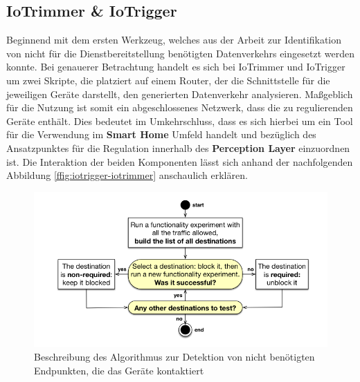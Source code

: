 \subsection{IoTrimmer \& IoTrigger}
\label{sec:Regulationsmöglichkeiten:ssec:IoTrimmer und IoTrigger}

Beginnend mit dem ersten Werkzeug, welches aus der Arbeit \cite{Mandalari2021} zur Identifikation von nicht für die Dienstbereitstellung benötigten Datenverkehrs eingesetzt werden konnte. Bei genauerer Betrachtung handelt es sich bei IoTrimmer und IoTrigger \cite{IoTrim2021} um zwei Skripte, die platziert auf einem Router, der die Schnittstelle für die jeweiligen Geräte darstellt, den generierten Datenverkehr analysieren. 
Maßgeblich für die Nutzung ist somit ein abgeschlossenes Netzwerk, dass die zu regulierenden Geräte enthält. Dies bedeutet im Umkehrschluss, dass es sich hierbei um ein Tool für die Verwendung im \textbf{Smart Home} Umfeld handelt und bezüglich des Ansatzpunktes für die Regulation innerhalb des \textbf{Perception Layer} einzuordnen ist.
Die Interaktion der beiden Komponenten lässt sich anhand der nachfolgenden Abbildung \ref{ffig:iotrigger-iotrimmer} anschaulich erklären.

\begin{figure}
    \centering
    \includegraphics[width=\textwidth]{main/countermeasures/pictures/Identification_Non_Essential_Traffic}
    \caption{Beschreibung des Algorithmus zur Detektion von nicht benötigten Endpunkten, die das Geräte kontaktiert \cite{Mandalari2021}}
    \label{fig:iotrigger-iotrimmer}
\end{figure}


